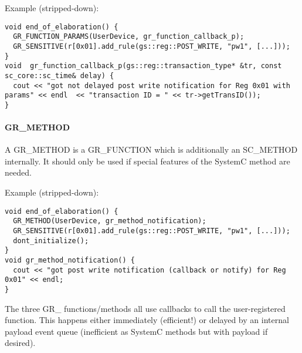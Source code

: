 Example (stripped-down):
\begin{lstlisting}
void end_of_elaboration() {
  GR_FUNCTION_PARAMS(UserDevice, gr_function_callback_p);
  GR_SENSITIVE(r[0x01].add_rule(gs::reg::POST_WRITE, "pw1", [...]));
}
void  gr_function_callback_p(gs::reg::transaction_type* &tr, const sc_core::sc_time& delay) {
  cout << "got not delayed post write notification for Reg 0x01 with params" << endl  << "transaction ID = " << tr->getTransID());
}
\end{lstlisting}


\paragraph{GR\_METHOD} 
A {\sffamily GR\_METHOD} is a {\sffamily GR\_FUNCTION} which is additionally an {\sffamily SC\_METHOD} internally. It should only be used if special features of the SystemC method are needed. 



Example (stripped-down):
\begin{lstlisting}
void end_of_elaboration() {
  GR_METHOD(UserDevice, gr_method_notification);
  GR_SENSITIVE(r[0x01].add_rule(gs::reg::POST_WRITE, "pw1", [...]));
  dont_initialize();
}
void gr_method_notification() {
  cout << "got post write notification (callback or notify) for Reg 0x01" << endl;
}
\end{lstlisting}


The three {\sffamily GR\_} functions/methods all use callbacks to call the user-registered function. This happens either immediately (efficient!) or delayed by an internal payload event queue (inefficient as SystemC methods but with payload if desired).



